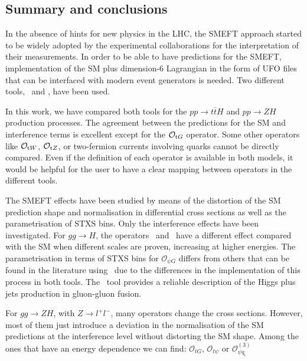 \subsection{Summary and conclusions}
In the absence of hints for new physics in the LHC, the SMEFT approach started to be widely adopted by the experimental collaborations for the interpretation of their measurements. In order to be able to have predictions for the SMEFT, implementation of the SM plus dimension-6 Lagrangian in the form of UFO files that can be interfaced with modern event generators is needed. Two different tools, \SMEFTsim\ and \SMEFTatNLO, have been used.

In this work, we have compared both tools for the $pp\to t\bar{t}H$ and $pp\to ZH$ production processes. The agreement between the predictions for the SM and interference terms is excellent except for the $\mathcal{O}_{\textrm tG}$ operator. Some other operators like $\mathcal{O}_{\textrm tW}$, $\mathcal{O}_{\textrm tZ}$, or two-fermion currents involving quarks cannot be directly compared. Even if the definition of each operator is available in both models, it would be helpful for the user to have a clear mapping between operators in the different tools.

The SMEFT effects have been studied by means of the distortion of the SM prediction shape and normalisation in differential cross sections as well as the parametrisation of STXS bins. Only the interference effects have been investigated. For $gg\to H$, the operators \cpG\ and \ctG\ have a different effect compared with the SM when different scales are proven, increasing at higher energies.
The parametrisation in terms of STXS bins for $\mathcal{O}_{\psi G}$ differs from others that can be found in the literature using \SMEFTsim\ due to the differences in the implementation of this process in both tools. The \SMEFTatNLO\ tool provides a reliable description of the Higgs plus jets production in gluon-gluon fusion.

For $gg\to ZH$, with $Z\to l^{+}l^{-}$,  many operators change the cross sections. However, most of them just introduce a deviation in the normalisation of the SM predictions at the interference level without distorting the SM shape. Among the ones that have an energy dependence we can find: $\mathcal{O}_{tG}$, $\mathcal{O}_{t\psi}$ or $\mathcal{O}_{\psi q_i}^{(3)}$ 

